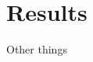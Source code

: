 \documentclass[paper.tex]{subfiles}
\begin{document}
	\section{Results}
	Other things 
\end{document}
